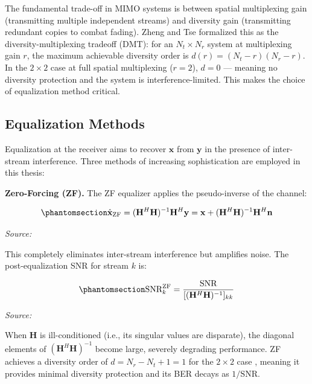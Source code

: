 The fundamental trade-off in MIMO systems is between spatial multiplexing gain (transmitting multiple independent streams) and diversity gain (transmitting redundant copies to combat fading). Zheng and Tse \cite{zheng2003diversity} formalized this as the diversity-multiplexing tradeoff (DMT): for an \(N_t \times N_r\) system at multiplexing gain \(r\), the maximum achievable diversity order is \(d(r) = (N_t - r)(N_r - r)\). In the \(2 \times 2\) case at full spatial multiplexing (\(r = 2\)), \(d = 0\) --- meaning no diversity protection and the system is interference-limited. This makes the choice of equalization method critical.

\subsection{Equalization Methods}\label{sec:equalization-methods}

Equalization at the receiver aims to recover \(\mathbf{x}\) from \(\mathbf{y}\) in the presence of inter-stream interference. Three methods of increasing sophistication are employed in this thesis:

\textbf{Zero-Forcing (ZF).} The ZF equalizer applies the pseudo-inverse of the channel:

\begin{equation}\protect\phantomsection\label{eq:zf-equalizer}{\hat{\mathbf{x}}_{\text{ZF}} = (\mathbf{H}^H\mathbf{H})^{-1}\mathbf{H}^H\mathbf{y} = \mathbf{x} + (\mathbf{H}^H\mathbf{H})^{-1}\mathbf{H}^H\mathbf{n}
}\end{equation} \par{\small\textit{Source: \cite{tse2005fundamentals, tse1999linear}}}

This completely eliminates inter-stream interference but amplifies noise. The post-equalization SNR for stream \(k\) is:

\begin{equation}\protect\phantomsection\label{eq:zf-snr}{\text{SNR}_k^{\text{ZF}} = \frac{\text{SNR}}{[(\mathbf{H}^H\mathbf{H})^{-1}]_{kk}}
}\end{equation} \par{\small\textit{Source: \cite{tse2005fundamentals, tse1999linear}}}

When \(\mathbf{H}\) is ill-conditioned (i.e., its singular values are disparate), the diagonal elements of \((\mathbf{H}^H\mathbf{H})^{-1}\) become large, severely degrading performance. ZF achieves a diversity order of \(d = N_r - N_t + 1 = 1\) for the \(2 \times 2\) case \cite{tse2005fundamentals}, meaning it provides minimal diversity protection and its BER decays as \(1/\text{SNR}\).

